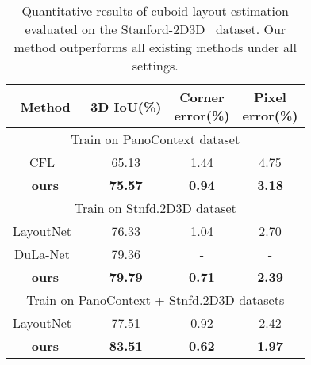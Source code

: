 \documentclass[10pt,twocolumn,letterpaper]{article}
\begin{document}
\begin{table}[h]
    \centering
    \begin{tabular}{|c|c|c|c|} 
        \hline
        Method & 3D IoU(\%) & \makecell{Corner\\error(\%)} & \makecell{Pixel\\error(\%)} \\
        
        \hline\hline
        \multicolumn{4}{|c|}{Train on PanoContext dataset} \\ [0.5ex]
        \hline
        CFL~\cite{fernandez2019CFL} & 65.13 & 1.44 & 4.75 \\
        \hline
        \textbf{ours} & \textbf{75.57} & \textbf{0.94} & \textbf{3.18} \\
        \hline
        
        \hline\hline
        \multicolumn{4}{|c|}{Train on Stnfd.2D3D dataset} \\ [0.5ex]
        \hline
        LayoutNet~\cite{zou2018layoutnet} & 76.33 & 1.04 & 2.70 \\
        \hline
        DuLa-Net~\cite{yang2018dula} & 79.36 & - & - \\
        \hline
        \textbf{ours} & \textbf{79.79} & \textbf{0.71} & \textbf{2.39} \\
        \hline
        
        \hline\hline
        \multicolumn{4}{|c|}{Train on PanoContext + Stnfd.2D3D datasets} \\ [0.5ex]
        \hline
        LayoutNet~\cite{zou2018layoutnet} & 77.51 & 0.92 & 2.42 \\
        \hline
        \textbf{ours} & \textbf{83.51} & \textbf{0.62} & \textbf{1.97} \\
        \hline
        
    \end{tabular}

    \caption{
    Quantitative results of cuboid layout estimation evaluated on the Stanford-2D3D~\cite{2017arXiv170201105A} dataset.
    Our method outperforms all existing methods under all settings.
    }
    \label{table:quan_st2d3d}
\end{table}
\end{document}

